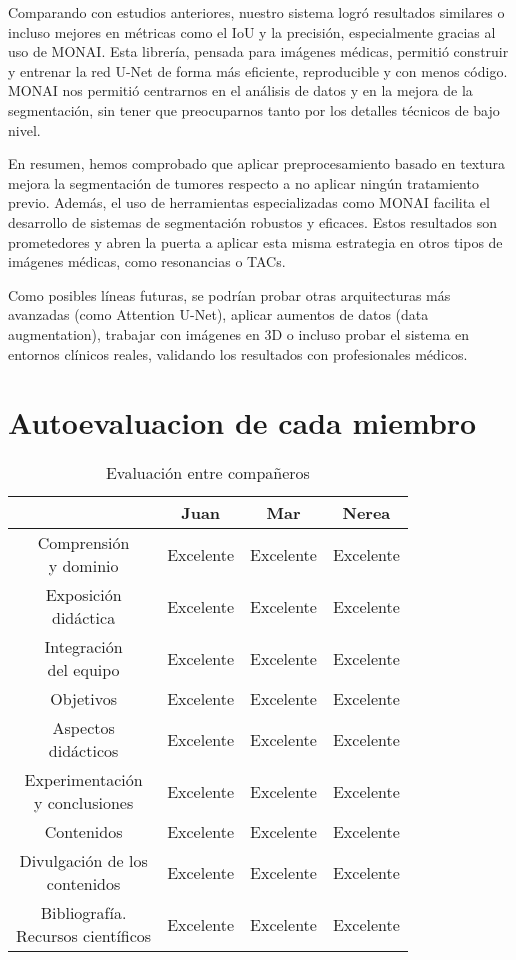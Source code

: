\documentclass[12pt]{article}
\begin{document}
Comparando con estudios anteriores, nuestro sistema logró resultados similares o incluso mejores en métricas como el IoU y la precisión, especialmente gracias al uso de MONAI. Esta librería, pensada para imágenes médicas, permitió construir y entrenar la red U-Net de forma más eficiente, reproducible y con menos código. MONAI nos permitió centrarnos en el análisis de datos y en la mejora de la segmentación, sin tener que preocuparnos tanto por los detalles técnicos de bajo nivel.

En resumen, hemos comprobado que aplicar preprocesamiento basado en textura mejora la segmentación de tumores respecto a no aplicar ningún tratamiento previo. Además, el uso de herramientas especializadas como MONAI facilita el desarrollo de sistemas de segmentación robustos y eficaces. Estos resultados son prometedores y abren la puerta a aplicar esta misma estrategia en otros tipos de imágenes médicas, como resonancias o TACs.

Como posibles líneas futuras, se podrían probar otras arquitecturas más avanzadas (como Attention U-Net), aplicar aumentos de datos (data augmentation), trabajar con imágenes en 3D o incluso probar el sistema en entornos clínicos reales, validando los resultados con profesionales médicos.

\section{Autoevaluacion de cada miembro}

\begin{table}[H]
\centering
\begin{tabular}{|c|c|c|c|}
\hline
\textbf{ } & \textbf{Juan} & \textbf{Mar} & \textbf{Nerea} \\
\hline
\makecell{Comprensión \\ y dominio} & Excelente & Excelente & Excelente \\
\hline
\makecell{Exposición \\ didáctica} & Excelente & Excelente & Excelente \\
\hline
\makecell{Integración \\ del equipo} & Excelente & Excelente & Excelente \\
\hline
Objetivos & Excelente & Excelente & Excelente \\
\hline
\makecell{Aspectos \\ didácticos} & Excelente & Excelente & Excelente \\
\hline
\makecell{Experimentación \\ y conclusiones} & Excelente & Excelente & Excelente \\
\hline
Contenidos & Excelente & Excelente & Excelente \\
\hline
\makecell{Divulgación de los \\ contenidos} & Excelente & Excelente & Excelente \\
\hline
\makecell{Bibliografía. \\ Recursos científicos} & Excelente & Excelente & Excelente \\
\hline
\end{tabular}
\caption{Evaluación entre compañeros}
\end{table}
\end{document}
